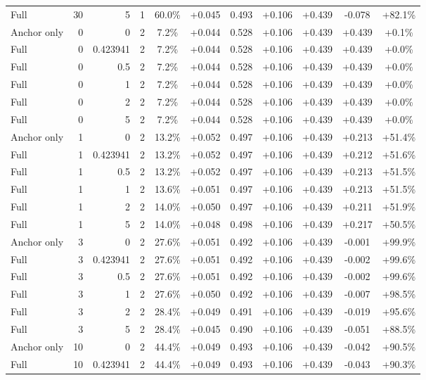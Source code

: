 \begin{table}[htbp]
\begin{tabular}{lrrrccccccc}
Full & 30 & 5 & 1 & 60.0\% & +0.045 & 0.493 & +0.106 & +0.439 & -0.078 & +82.1\% \\
Anchor only & 0 & 0 & 2 & 7.2\% & +0.044 & 0.528 & +0.106 & +0.439 & +0.439 & +0.1\% \\
Full & 0 & 0.423941 & 2 & 7.2\% & +0.044 & 0.528 & +0.106 & +0.439 & +0.439 & +0.0\% \\
Full & 0 & 0.5 & 2 & 7.2\% & +0.044 & 0.528 & +0.106 & +0.439 & +0.439 & +0.0\% \\
Full & 0 & 1 & 2 & 7.2\% & +0.044 & 0.528 & +0.106 & +0.439 & +0.439 & +0.0\% \\
Full & 0 & 2 & 2 & 7.2\% & +0.044 & 0.528 & +0.106 & +0.439 & +0.439 & +0.0\% \\
Full & 0 & 5 & 2 & 7.2\% & +0.044 & 0.528 & +0.106 & +0.439 & +0.439 & +0.0\% \\
Anchor only & 1 & 0 & 2 & 13.2\% & +0.052 & 0.497 & +0.106 & +0.439 & +0.213 & +51.4\% \\
Full & 1 & 0.423941 & 2 & 13.2\% & +0.052 & 0.497 & +0.106 & +0.439 & +0.212 & +51.6\% \\
Full & 1 & 0.5 & 2 & 13.2\% & +0.052 & 0.497 & +0.106 & +0.439 & +0.213 & +51.5\% \\
Full & 1 & 1 & 2 & 13.6\% & +0.051 & 0.497 & +0.106 & +0.439 & +0.213 & +51.5\% \\
Full & 1 & 2 & 2 & 14.0\% & +0.050 & 0.497 & +0.106 & +0.439 & +0.211 & +51.9\% \\
Full & 1 & 5 & 2 & 14.0\% & +0.048 & 0.498 & +0.106 & +0.439 & +0.217 & +50.5\% \\
Anchor only & 3 & 0 & 2 & 27.6\% & +0.051 & 0.492 & +0.106 & +0.439 & -0.001 & +99.9\% \\
Full & 3 & 0.423941 & 2 & 27.6\% & +0.051 & 0.492 & +0.106 & +0.439 & -0.002 & +99.6\% \\
Full & 3 & 0.5 & 2 & 27.6\% & +0.051 & 0.492 & +0.106 & +0.439 & -0.002 & +99.6\% \\
Full & 3 & 1 & 2 & 27.6\% & +0.050 & 0.492 & +0.106 & +0.439 & -0.007 & +98.5\% \\
Full & 3 & 2 & 2 & 28.4\% & +0.049 & 0.491 & +0.106 & +0.439 & -0.019 & +95.6\% \\
Full & 3 & 5 & 2 & 28.4\% & +0.045 & 0.490 & +0.106 & +0.439 & -0.051 & +88.5\% \\
Anchor only & 10 & 0 & 2 & 44.4\% & +0.049 & 0.493 & +0.106 & +0.439 & -0.042 & +90.5\% \\
Full & 10 & 0.423941 & 2 & 44.4\% & +0.049 & 0.493 & +0.106 & +0.439 & -0.043 & +90.3\% \\

\end{tabular}
\end{table}

